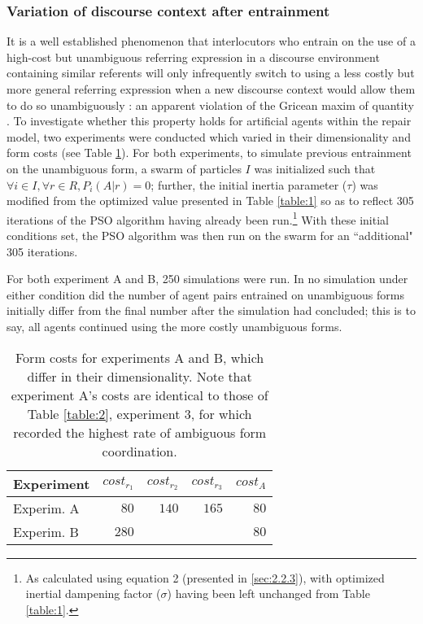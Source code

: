 \documentclass[11pt]{article}
\begin{document}
\subsubsection{Variation of discourse context after entrainment}
It is a well established phenomenon that interlocutors who entrain on the use of a high-cost but unambiguous referring expression in a discourse environment containing similar referents will only infrequently switch to using a less costly but more general referring expression when a new discourse \mbox{context} would allow them to do so unambiguously \citep{brennan1996}: an apparent violation of the Gricean maxim of quantity \citep{grice1975}. To investigate whether this property holds for artificial agents within the repair model, two experiments were conducted which varied in their dimensionality and form costs (see Table \ref{table:4}). For both experiments, to simulate previous entrainment on the unambiguous form, a swarm of particles $I$ was initialized such that $\forall i \in I, \forall r \in R, P_i(A|r) = 0$; further, the initial inertia parameter ($\tau$) was modified from the optimized value presented in Table \ref{table:1} so as to reflect 305 iterations of the PSO algorithm having already been run.\footnote{As calculated using equation 2 (presented in \ref{sec:2.2.3}), with optimized inertial dampening factor ($\sigma$) having been left unchanged from Table \ref{table:1}.} With these initial conditions set, the PSO algorithm was then run on the swarm for an ``additional" 305 iterations.

For both experiment A and B, 250 simulations were run. In no simulation under either condition did the number of agent pairs entrained on unambiguous forms initially differ from the final number after the simulation had concluded; this is to say, all agents continued using the more costly unambiguous forms.

\begin{table}
\begin{center}
    \begin{tabular}{ l r r r r }
    Experiment & $cost_{r_1}$ & $cost_{r_2}$ & $cost_{r_3}$ & $cost_A$\\ \hline
    Experim. A & $80$  & $140$ & $165$ & $80$ \\ \hline
    Experim. B & $280$ &       &       & $80$ \\ \hline
    \end{tabular}
    \caption{Form costs for experiments A and B, which differ in their dimensionality. Note that experiment A's costs are identical to those of Table \ref{table:2}, experiment 3, for which \citeauthor{rohde2012} recorded the highest rate of ambiguous form coordination.}
    \label{table:4}
\end{center}
\end{table}
\end{document}
